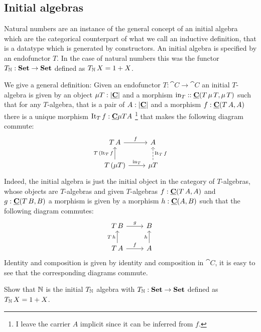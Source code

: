 \subsection{Initial algebras}
\label{sec:initial-algebras}

Natural numbers are an instance of the general concept of an initial algebra which are the categorical counterpart of what we call an inductive definition, that is a datatype which is generated by constructors. An initial algebra is specified by an endofunctor $T$. In the case of natural numbers this was the functor $T_{\mathbb{N}} : \mathbf{Set} \to \mathbf{Set}$ defined as $T_{\mathbb{N}}\,X = 1+X$. 

We give a general definition: Given an endofunctor $T : \cat{C} \to \cat{C}$ an initial $T$-algebra is given by an object $\mu T : |\underline{\mathbf{C}}|$ and a morphism $\mathrm{in}_T : : \underline{\mathbf{C}}(T\,\mu\,T,\mu\,T)$ such that for any $T$-algebra, that is a pair of $A : |\underline{\mathbf{C}}|$ and a morphism 
$f : \underline{\mathbf{C}}(T\,A,A)$ there is a unique morphism $\mathrm{It}_T \,f: \underline{\mathbf{C}}{\mu T}{A}$
\footnote{I leave the carrier $A$ implicit since it can be inferred from $f$.}
that makes the following diagram commute:
\[\begin{tikzcd}
T\,A \arrow[r,"f"]  & A \\
T\,(\mu T) \arrow[u, "T\, (\It_T \, f"]  \arrow[r,"\inn_T"] & \mu T \arrow[u,"\It_T \, f" right,dashrightarrow]
\end{tikzcd}\]  
Indeed, the initial algebra is just the initial object in the category of $T$-algebras, whose objects are $T$-algebras and given $T$-algebras $f : \underline{\mathbf{C}}(T\,A,A)$ and $g : \underline{\mathbf{C}}(T\,B,B)$ a morphism is given by a morphism $h : \underline{\mathbf{C}}(A,B)$ such that the following diagram commutes:
\[\begin{tikzcd}
T\,B \arrow[r,"g"] & B \\
 T\,A \arrow[r,"f"] \arrow[u,"T\,h"]  & A \arrow[u,"h"] 
\end{tikzcd}\]  
Identity and composition is given by identity and composition in $\cat{C}$, it is easy to see that the corresponding diagrams commute. 

\begin{Exercise}
Show that $\mathbb{N}$ is the initial $T_{\mathbb{N}}$ algebra with $T_{\mathbb{N}} : \mathbf{Set} \to \mathbf{Set}$ defined as $T_{\mathbb{N}}\,X = 1+X$. 
\end{Exercise}

